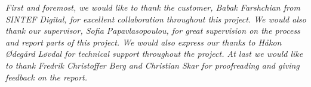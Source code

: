 \vspace*{7cm}
\begin{center}

\emph{First and foremost, we would like to thank the customer, Babak Farshchian from SINTEF Digital, for excellent collaboration throughout this project. We would also thank our supervisor, Sofia Papavlasopoulou, for great supervision on the process and report parts of this project. We would also express our thanks to Håkon Ødegård Løvdal for technical support throughout the project. At last we would like to thank Fredrik Christoffer Berg and Christian Skar for proofreading and giving feedback on the report.}

\end{center}

\cleardoublepage